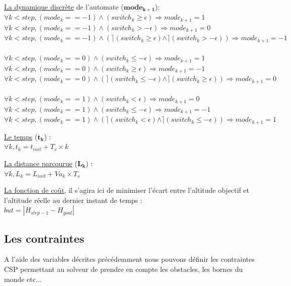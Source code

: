 	\underline{La dynamique discrète} de l'automate ($\mathbf{mode_{k+1}}$):\\
	$\forall k < step, (mode_k == -1) \wedge (switch_k \geq \epsilon) \Rightarrow mode_{k+1} = 1$\\
	$\forall k < step, (mode_k == -1) \wedge (switch_k > -\epsilon) \Rightarrow mode_{k+1} = 0$ \\
	$\forall k < step, (mode_k == -1) \wedge (\rceil(switch_k \geq \epsilon) \wedge \rceil(switch_k > -\epsilon)) \Rightarrow mode_{k+1} = -1$\\ \\	
	$\forall k < step, (mode_k == 0) \wedge (switch_k \leq -\epsilon) \Rightarrow mode_{k+1} = 1$\\
	$\forall k < step, (mode_k == 0) \wedge (switch_k \geq \epsilon) \Rightarrow mode_{k+1} = -1$ \\
	$\forall k < step, (mode_k == 0) \wedge (\rceil(switch_k \leq -\epsilon) \wedge \rceil(switch_k \geq \epsilon)) \Rightarrow mode_{k+1} = 0$\\ \\	
	$\forall k < step, (mode_k == 1) \wedge (switch_k < \epsilon) \Rightarrow mode_{k+1} = 0$\\
	$\forall k < step, (mode_k == 1) \wedge (switch_k \leq -\epsilon) \Rightarrow mode_{k+1} = -1$ \\
	$\forall k < step, (mode_k == 1) \wedge (\rceil(switch_k < \epsilon) \wedge \rceil(switch_k \leq -\epsilon)) \Rightarrow mode_{k+1} = 1$
			
	\underline{Le temps} ($\mathbf{t_k}$) :\\
	$\forall k, t_k = t_{init} + T_s\times k$
	
	\underline{La distance parcourue} ($\mathbf{L_k}$) :\\
	$\forall k, L_k = L_{init} + Va_k\times T_s$
	
	\underline{La fonction de coût}, il s'agira ici de minimiser l'écart entre l'altitude objectif et l'altitude réelle au dernier instant de temps :\\
	$but = |H_{step-1} - H_{goal}|$
	


\subsection{Les contraintes}
A l'aide des variables décrites précédemment nous pouvons définir les contraintes CSP permettant au solveur de prendre en compte les obstacles, les bornes du monde etc...

